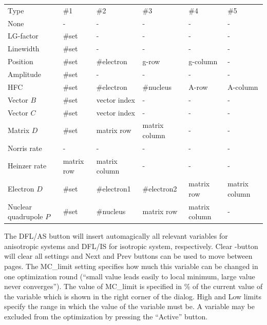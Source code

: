 \documentclass[byrevtex,amssymb,aps,pra,floatfix,letterpaper]{revtex4}
\begin{document}
\begin{center}
{\small
\begin{tabular}{llllll}
Type         &        \#1    &     \#2     &       \#3    &        \#4     &       \#5\\
None         &        -      &    -        &     -        &     -          &   -\\
LG-factor    &        \#set  &     -       &      -       &      -         &    -\\
Linewidth    &        \#set  &     -       &      -       &      -         &    -\\
Position     &        \#set  &     \#electron &    g-row  &       g-column &     -\\
Amplitude    &        \#set  &     -       &      -       &      -         &    -\\
HFC          &        \#set  &     \#electron  &   \#nucleus  &    A-row   &      A-column\\
Vector $B$     &        \#set  &     vector index & -      &        -      &       -\\
Vector $C$     &        \#set  &     vector index & -      &        -      &       -\\
Matrix $D$     &        \#set  &     matrix row  &  matrix column & -     &        -\\
Norris rate  &         -     &     -      &       -      &       -     &        -\\
Heinzer rate &        matrix row & matrix column & -      &       -     &        -\\
Electron $D$   &        \#set  &     \#electron1 &   \#electron2  &  matrix row  &  matrix column\\
Nuclear quadrupole $P$ & \#set &      \#nucleus  &    matrix row  &  matrix column & -\\
\end{tabular}
}
\end{center}\vspace*{0.2cm}

\noindent
The DFL/AS button will insert automagically all relevant variables for anisotropic systems and DFL/IS for isotropic system, respectively. Clear -button will clear all settings and Next and Prev buttons can be used to move between pages. The MC\_limit setting specifies how much this variable can be changed in
one optimization round (``small value leads easily to local minimum, large value never converges''). The value of MC\_limit is specified in \% of the current value of the variable which is shown in the right corner of the dialog. High and Low limits specify the range in which the value of the variable must be. A variable may be excluded from the optimization by pressing the ``Active'' button.
\end{document}
